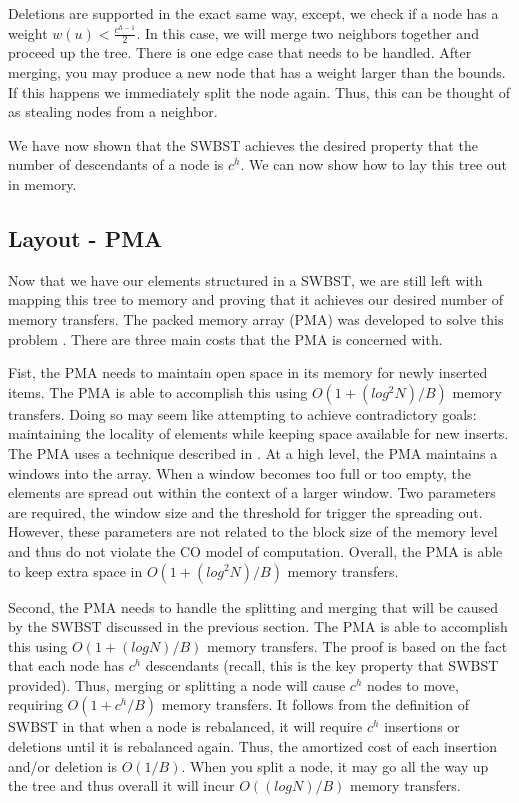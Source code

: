 \documentclass{style}
\begin{document}
Deletions are supported in the exact same way, except, we check if a node has
a weight $w(u) < \frac{c^{h-1}}{2}$. In this case, we will merge two neighbors
together and proceed up the tree. There is one edge case that needs to be
handled. After merging, you may produce a new node that has a weight larger
than the bounds. If this happens we immediately split the node again. Thus,
this can be thought of as stealing nodes from a neighbor.

We have now shown that the SWBST achieves the desired property that the number
of descendants of a node is $c^h$. We can now show how to lay this tree out in
memory.

\subsection{Layout - PMA}
\label{sec:layout}


Now that we have our elements structured in a SWBST, we are still left with
mapping this tree to memory and proving that it achieves our desired number of
memory transfers. The packed memory array (PMA) was developed to solve this
problem \cite{BenderDemainColton}. There are three main costs that the PMA is concerned with.

Fist, the PMA needs to maintain open space in its memory for newly inserted
items. The PMA is able to accomplish this using $O(1 + (log^2 N) / B)$ memory
transfers. Doing so may seem like attempting to achieve contradictory goals:
maintaining the locality of elements while keeping space available for new
inserts. The PMA uses a technique described in \cite{pma}. At a high level, the PMA
maintains a windows into the array. When a window becomes too full or too
empty, the elements are spread out within the context of a larger window. Two
parameters are required, the window size and the threshold for trigger the
spreading out. However, these parameters are not related to the block size of
the memory level and thus do not violate the CO model of computation. Overall,
the PMA is able to keep extra space in $O(1 + (log^2 N) / B)$ memory
transfers.

Second, the PMA needs to handle the splitting and merging that will be caused
by the SWBST discussed in the previous section. The PMA is able to accomplish
this using $O(1 + (log N) /B)$ memory transfers. The proof is based on the
fact that each node has $c^h$ descendants (recall, this is the key property
that SWBST provided). Thus, merging or splitting a node will cause $c^h$ nodes
to move, requiring $O(1 + c^h/B)$ memory transfers. It follows from the
definition of SWBST in \cite{swbst} that when a node is rebalanced, it will require
$c^h$ insertions or deletions until it is rebalanced again. Thus, the
amortized cost of each insertion and/or deletion is $O(1/B)$. When you split a
node, it may go all the way up the tree and thus overall it will incur $O((log
N) / B)$ memory transfers.
\end{document}
